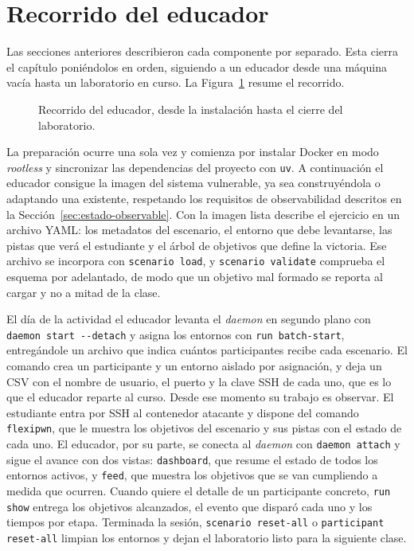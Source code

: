 \section{Recorrido del educador}
\label{sec:recorrido-educador}

Las secciones anteriores describieron cada componente por separado. Esta cierra
el capítulo poniéndolos en orden, siguiendo a un educador desde una máquina
vacía hasta un laboratorio en curso. La Figura~\ref{fig:recorrido-educador}
resume el recorrido.

\begin{figure}[H]
    \centering
    
    \caption{Recorrido del educador, desde la instalación hasta el cierre del
    laboratorio.}
    \label{fig:recorrido-educador}
\end{figure}

La preparación ocurre una sola vez y comienza por instalar Docker en modo
\textit{rootless} y sincronizar las dependencias del proyecto con
\texttt{uv}. A continuación el educador consigue la imagen del sistema
vulnerable, ya sea construyéndola o adaptando una existente, respetando los
requisitos de observabilidad descritos en la
Sección~\ref{sec:estado-observable}. Con la imagen lista describe el ejercicio
en un archivo YAML: los metadatos del escenario, el entorno que debe levantarse,
las pistas que verá el estudiante y el árbol de objetivos que define la victoria.
Ese archivo se incorpora con \texttt{scenario load}, y \texttt{scenario
validate} comprueba el esquema por adelantado, de modo que un objetivo mal
formado se reporta al cargar y no a mitad de la clase.

El día de la actividad el educador levanta el \textit{daemon} en segundo plano
con \texttt{daemon start -{}-detach} y asigna los entornos con \texttt{run
batch-start}, entregándole un archivo que indica cuántos participantes recibe
cada escenario. El comando crea un participante y un entorno aislado por
asignación, y deja un CSV con el nombre de usuario, el puerto y la clave SSH de
cada uno, que es lo que el educador reparte al curso. Desde ese momento su
trabajo es observar. El estudiante entra por SSH al contenedor atacante y
dispone del comando \texttt{flexipwn}, que le muestra los objetivos del
escenario y sus pistas con el estado de cada uno. El educador, por su parte, se
conecta al \textit{daemon} con \texttt{daemon attach} y sigue el avance con dos
vistas: \texttt{dashboard}, que resume el estado de todos los entornos activos,
y \texttt{feed}, que muestra los objetivos que se van cumpliendo a medida que
ocurren. Cuando quiere el detalle de un participante concreto, \texttt{run show}
entrega los objetivos alcanzados, el evento que disparó cada uno y los tiempos
por etapa. Terminada la sesión, \texttt{scenario reset-all} o \texttt{participant reset-all} 
limpian los entornos y dejan el laboratorio listo para la siguiente clase.

